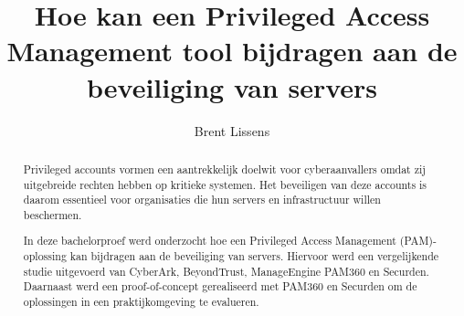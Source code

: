 \documentclass[a0,portrait]{hogent-poster}
\title{Hoe kan een Privileged Access Management tool bijdragen aan de beveiliging van servers}
\subtitle{}
\author{Brent Lissens}
\begin{document}
\maketitle

\begin{abstract}
	Privileged accounts vormen een aantrekkelijk doelwit voor cyberaanvallers omdat zij uitgebreide rechten hebben op kritieke systemen. Het beveiligen van deze accounts is daarom essentieel voor organisaties die hun servers en infrastructuur willen beschermen.
	
	In deze bachelorproef werd onderzocht hoe een Privileged Access Management (PAM)-oplossing kan bijdragen aan de beveiliging van servers. Hiervoor werd een vergelijkende studie uitgevoerd van CyberArk, BeyondTrust, ManageEngine PAM360 en Securden. Daarnaast werd een proof-of-concept gerealiseerd met PAM360 en Securden om de oplossingen in een praktijkomgeving te evalueren.
\end{abstract}
\end{document}
